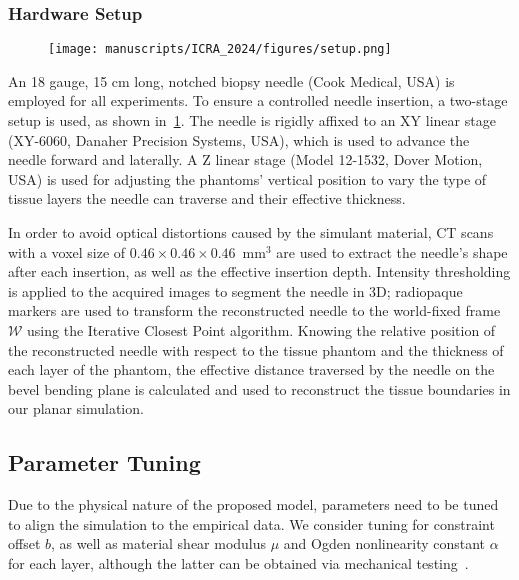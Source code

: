 \subsubsection{Hardware Setup}
\label{sec:chap-4-hardware-setup}

\begin{figure}[ht]
  \centering
  \texttt{[image: manuscripts/ICRA\_2024/figures/setup.png]}
  \caption{}
  \label{fig:chap-4-robot}
\end{figure}

An 18 gauge, 15 cm long, notched biopsy needle (Cook Medical, USA) is employed for all experiments. To ensure a controlled needle insertion, a two-stage setup is used, as shown in~\cref{fig:chap-4-robot}. The needle is rigidly affixed to an XY linear stage (XY-6060, Danaher Precision Systems, USA), which is used to advance the needle forward and laterally. A Z linear stage (Model 12-1532, Dover Motion, USA) is used for adjusting the phantoms' vertical position to vary the type of tissue layers the needle can traverse and their effective thickness. 

In order to avoid optical distortions caused by the simulant material, CT scans with a voxel size of $0.46\times0.46\times0.46$~mm$^{3}$ are used to extract the needle's shape after each insertion, as well as the effective insertion depth. Intensity thresholding is applied to the acquired images to segment the needle in 3D; radiopaque markers are used to transform the reconstructed needle to the world-fixed frame $\mathcal{W}$ using the Iterative Closest Point algorithm. Knowing the relative position of the reconstructed needle with respect to the tissue phantom and the thickness of each layer of the phantom, the effective distance traversed by the needle on the bevel bending plane is calculated and used to reconstruct the tissue boundaries in our planar simulation.

\subsection{Parameter Tuning}
\label{sec:chap-4-parameter-tuning}
Due to the physical nature of the proposed model, parameters need to be tuned to align the simulation to the empirical data. We consider tuning for constraint offset $b$, as well as material shear modulus $\mu$ and Ogden nonlinearity constant $\alpha$ for each layer, although the latter can be obtained via mechanical testing~\parencite{singhMechanicalPropertiesWholebody2021}.

